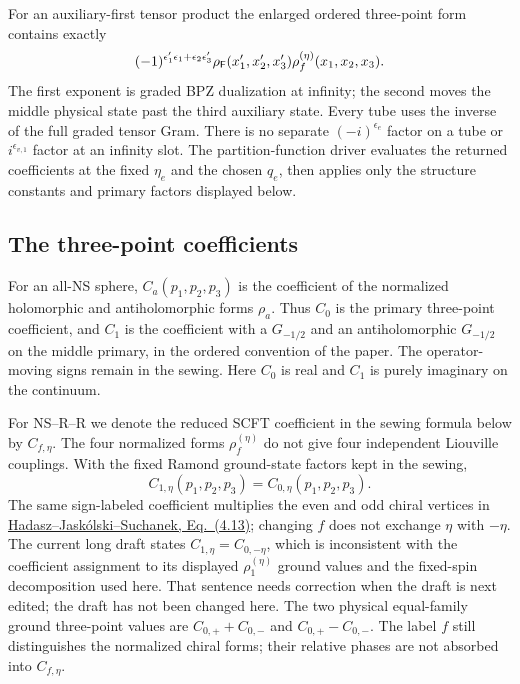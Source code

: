 For an auxiliary-first tensor product the enlarged ordered
three-point form contains exactly
\begin{equation}
 (-1)^{\epsilon'_1\epsilon_1+\epsilon_2\epsilon'_3}
 \rho_{\mathsf F}(x'_1,x'_2,x'_3)\rho_f^{(\eta)}(x_1,x_2,x_3).
 \label{eq:partition-enlarged-vertex}
\end{equation}
The first exponent is graded BPZ dualization at infinity; the
second moves the middle physical state past the third auxiliary
state. Every tube uses the inverse of the full graded tensor Gram.
There is no separate $(-i)^{\epsilon_e}$ factor on a tube or
$i^{\epsilon_{v,1}}$ factor at an infinity slot.
The partition-function driver evaluates the returned coefficients
at the fixed $\eta_e$ and the chosen $q_e$, then applies only the
structure constants and primary factors displayed below.

\subsection{The three-point coefficients}


For an all-NS sphere, $C_a(p_1,p_2,p_3)$ is the coefficient of the
normalized holomorphic and antiholomorphic forms $\rho_a$.
Thus $C_0$ is the primary three-point coefficient, and $C_1$
is the coefficient with a $G_{-1/2}$ and an antiholomorphic
$G_{-1/2}$ on the middle primary, in the ordered convention of
the paper. The operator-moving signs remain in the sewing.
Here $C_0$ is real and $C_1$ is purely imaginary on the continuum.

For NS--R--R we denote the reduced SCFT coefficient in the sewing
formula below by $C_{f,\eta}$. The four normalized forms
$\rho_f^{(\eta)}$ do not give four independent Liouville couplings.
With the fixed Ramond ground-state factors kept in the sewing,
\begin{equation}
 C_{1,\eta}(p_1,p_2,p_3)=C_{0,\eta}(p_1,p_2,p_3).
 \label{eq:partition-Cf}
\end{equation}
The same sign-labeled coefficient multiplies the even and odd chiral
vertices in \href{https://arxiv.org/pdf/0810.1203}{Hadasz--Jask\'olski--Suchanek,
Eq.~(4.13)}; changing $f$ does not exchange $\eta$ with $-\eta$.
The current long draft states $C_{1,\eta}=C_{0,-\eta}$, which is
inconsistent with the coefficient assignment to its displayed
$\rho_1^{(\eta)}$ ground values and the fixed-spin decomposition used
here. That sentence needs correction
when the draft is next edited; the draft has not been changed here.
The two physical equal-family ground three-point values are
$C_{0,+}+C_{0,-}$ and $C_{0,+}-C_{0,-}$.
The label $f$ still distinguishes the normalized chiral forms;
their relative phases are not absorbed into $C_{f,\eta}$.

